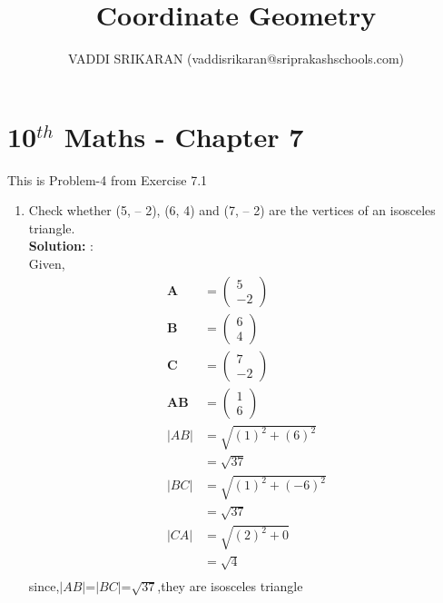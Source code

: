 \documentclass[12pt]{article}
\title{Coordinate Geometry}
\author{VADDI SRIKARAN (vaddisrikaran@sriprakashschools.com)}
\newcommand{\myvec}[1]{\ensuremath{\begin{pmatrix}#1\end{pmatrix}}}
\newcommand{\solution}{\noindent \textbf{Solution: }}
\let\vec\mathbf
\begin{document}
\maketitle
\section*{10$^{th}$ Maths - Chapter 7}
This is Problem-4 from Exercise 7.1
\begin{enumerate}
\item Check whether (5, – 2), (6, 4) and (7, – 2) are the vertices of an isosceles triangle. \\
\solution:\\
Given,
\begin{align}
\vec{A}&=\myvec{5\\-2}\\
\vec{B}&=\myvec{6\\4}\\
\vec{C}&=\myvec{7\\-2}\\
\vec{AB}&=\myvec{1\\6}\\
|AB|&=\sqrt{(1)^2+(6)^2}\\
&=\sqrt{37}\\
|BC|&=\sqrt{(1)^2+(-6)^2}\\
&=\sqrt{37}\\
|CA|&=\sqrt{(2)^2+0}\\
&=\sqrt{4}\\
\end{align}
since,$|AB|$=$|BC|$=$\sqrt{37}$,they are isosceles triangle
\end{enumerate}
\end{document}
